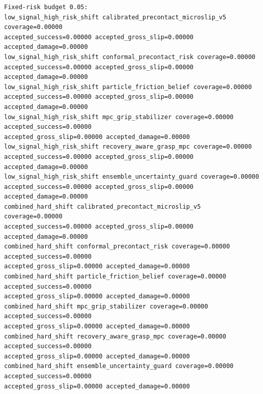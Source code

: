\documentclass{article}
\begin{document}
\begin{tiny}
\begin{verbatim}
Fixed-risk budget 0.05:
low_signal_high_risk_shift calibrated_precontact_microslip_v5 coverage=0.00000
accepted_success=0.00000 accepted_gross_slip=0.00000 accepted_damage=0.00000
low_signal_high_risk_shift conformal_precontact_risk coverage=0.00000
accepted_success=0.00000 accepted_gross_slip=0.00000 accepted_damage=0.00000
low_signal_high_risk_shift particle_friction_belief coverage=0.00000
accepted_success=0.00000 accepted_gross_slip=0.00000 accepted_damage=0.00000
low_signal_high_risk_shift mpc_grip_stabilizer coverage=0.00000 accepted_success=0.00000
accepted_gross_slip=0.00000 accepted_damage=0.00000
low_signal_high_risk_shift recovery_aware_grasp_mpc coverage=0.00000
accepted_success=0.00000 accepted_gross_slip=0.00000 accepted_damage=0.00000
low_signal_high_risk_shift ensemble_uncertainty_guard coverage=0.00000
accepted_success=0.00000 accepted_gross_slip=0.00000 accepted_damage=0.00000
combined_hard_shift calibrated_precontact_microslip_v5 coverage=0.00000
accepted_success=0.00000 accepted_gross_slip=0.00000 accepted_damage=0.00000
combined_hard_shift conformal_precontact_risk coverage=0.00000 accepted_success=0.00000
accepted_gross_slip=0.00000 accepted_damage=0.00000
combined_hard_shift particle_friction_belief coverage=0.00000 accepted_success=0.00000
accepted_gross_slip=0.00000 accepted_damage=0.00000
combined_hard_shift mpc_grip_stabilizer coverage=0.00000 accepted_success=0.00000
accepted_gross_slip=0.00000 accepted_damage=0.00000
combined_hard_shift recovery_aware_grasp_mpc coverage=0.00000 accepted_success=0.00000
accepted_gross_slip=0.00000 accepted_damage=0.00000
combined_hard_shift ensemble_uncertainty_guard coverage=0.00000 accepted_success=0.00000
accepted_gross_slip=0.00000 accepted_damage=0.00000

\end{verbatim}
\end{tiny}




\end{document}
